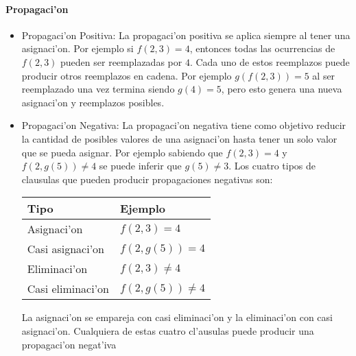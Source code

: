\paragraph{Propagaci'on}

\begin{itemize}

\item{Propagaci'on Positiva}:
La propagaci'on positiva se aplica siempre al tener una asignaci'on. Por ejemplo si $f(2,3)=4$, entonces todas las ocurrencias de $f(2,3)$ pueden ser reemplazadas por $4$. Cada uno de estos reemplazos puede producir otros reemplazos en cadena. Por ejemplo $g(f(2,3))=5$ al ser reemplazado una vez termina siendo $g(4)=5$, pero esto genera una nueva asignaci'on y reemplazos posibles.

\item{Propagaci'on Negativa}:
La propagaci'on negativa tiene como objetivo reducir la cantidad de posibles valores de una asignaci'on hasta tener un solo valor que se pueda asignar. Por ejemplo sabiendo que $f(2,3)=4$ y $f(2, g(5))\neq4$ se puede inferir que $g(5)\neq3$. Los cuatro tipos de clausulas que pueden producir propagaciones negativas son:

\medskip
\begin{center}
\begin{tabular}{ |l|l| }
\hline
Tipo & Ejemplo \\
\hline
Asignaci'on & $f(2,3)=4$ \\
Casi asignaci'on & $f(2,g(5))=4$ \\
Eliminaci'on & $f(2,3)\neq4$ \\
Casi eliminaci'on & $f(2,g(5))\neq4$ \\
\hline
\end{tabular}
\end{center}
\medskip

La asignaci'on se empareja con casi eliminaci'on y la eliminaci'on con casi asignaci'on. Cualquiera de estas cuatro cl'ausulas puede producir una propagaci'on negat'iva

\end{itemize}
